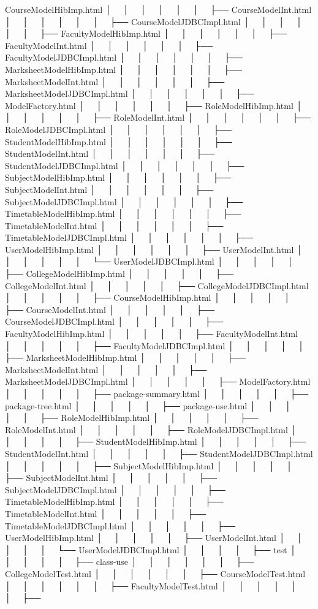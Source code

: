 Course\+Model\+Hib\+Imp.\+html │   │   │   │   │   │   ├── Course\+Model\+Int.\+html │   │   │   │   │   │   ├── Course\+Model\+JDBCImpl.\+html │   │   │   │   │   │   ├── Faculty\+Model\+Hib\+Imp.\+html │   │   │   │   │   │   ├── Faculty\+Model\+Int.\+html │   │   │   │   │   │   ├── Faculty\+Model\+JDBCImpl.\+html │   │   │   │   │   │   ├── Marksheet\+Model\+Hib\+Imp.\+html │   │   │   │   │   │   ├── Marksheet\+Model\+Int.\+html │   │   │   │   │   │   ├── Marksheet\+Model\+JDBCImpl.\+html │   │   │   │   │   │   ├── Model\+Factory.\+html │   │   │   │   │   │   ├── Role\+Model\+Hib\+Imp.\+html │   │   │   │   │   │   ├── Role\+Model\+Int.\+html │   │   │   │   │   │   ├── Role\+Model\+JDBCImpl.\+html │   │   │   │   │   │   ├── Student\+Model\+Hib\+Imp.\+html │   │   │   │   │   │   ├── Student\+Model\+Int.\+html │   │   │   │   │   │   ├── Student\+Model\+JDBCImpl.\+html │   │   │   │   │   │   ├── Subject\+Model\+Hib\+Imp.\+html │   │   │   │   │   │   ├── Subject\+Model\+Int.\+html │   │   │   │   │   │   ├── Subject\+Model\+JDBCImpl.\+html │   │   │   │   │   │   ├── Timetable\+Model\+Hib\+Imp.\+html │   │   │   │   │   │   ├── Timetable\+Model\+Int.\+html │   │   │   │   │   │   ├── Timetable\+Model\+JDBCImpl.\+html │   │   │   │   │   │   ├── User\+Model\+Hib\+Imp.\+html │   │   │   │   │   │   ├── User\+Model\+Int.\+html │   │   │   │   │   │   └── User\+Model\+JDBCImpl.\+html │   │   │   │   │   ├── College\+Model\+Hib\+Imp.\+html │   │   │   │   │   ├── College\+Model\+Int.\+html │   │   │   │   │   ├── College\+Model\+JDBCImpl.\+html │   │   │   │   │   ├── Course\+Model\+Hib\+Imp.\+html │   │   │   │   │   ├── Course\+Model\+Int.\+html │   │   │   │   │   ├── Course\+Model\+JDBCImpl.\+html │   │   │   │   │   ├── Faculty\+Model\+Hib\+Imp.\+html │   │   │   │   │   ├── Faculty\+Model\+Int.\+html │   │   │   │   │   ├── Faculty\+Model\+JDBCImpl.\+html │   │   │   │   │   ├── Marksheet\+Model\+Hib\+Imp.\+html │   │   │   │   │   ├── Marksheet\+Model\+Int.\+html │   │   │   │   │   ├── Marksheet\+Model\+JDBCImpl.\+html │   │   │   │   │   ├── Model\+Factory.\+html │   │   │   │   │   ├── package-\/summary.\+html │   │   │   │   │   ├── package-\/tree.\+html │   │   │   │   │   ├── package-\/use.\+html │   │   │   │   │   ├── Role\+Model\+Hib\+Imp.\+html │   │   │   │   │   ├── Role\+Model\+Int.\+html │   │   │   │   │   ├── Role\+Model\+JDBCImpl.\+html │   │   │   │   │   ├── Student\+Model\+Hib\+Imp.\+html │   │   │   │   │   ├── Student\+Model\+Int.\+html │   │   │   │   │   ├── Student\+Model\+JDBCImpl.\+html │   │   │   │   │   ├── Subject\+Model\+Hib\+Imp.\+html │   │   │   │   │   ├── Subject\+Model\+Int.\+html │   │   │   │   │   ├── Subject\+Model\+JDBCImpl.\+html │   │   │   │   │   ├── Timetable\+Model\+Hib\+Imp.\+html │   │   │   │   │   ├── Timetable\+Model\+Int.\+html │   │   │   │   │   ├── Timetable\+Model\+JDBCImpl.\+html │   │   │   │   │   ├── User\+Model\+Hib\+Imp.\+html │   │   │   │   │   ├── User\+Model\+Int.\+html │   │   │   │   │   └── User\+Model\+JDBCImpl.\+html │   │   │   │   ├── test │   │   │   │   │   ├── class-\/use │   │   │   │   │   │   ├── College\+Model\+Test.\+html │   │   │   │   │   │   ├── Course\+Model\+Test.\+html │   │   │   │   │   │   ├── Faculty\+Model\+Test.\+html │   │   │   │   │   │   ├── 